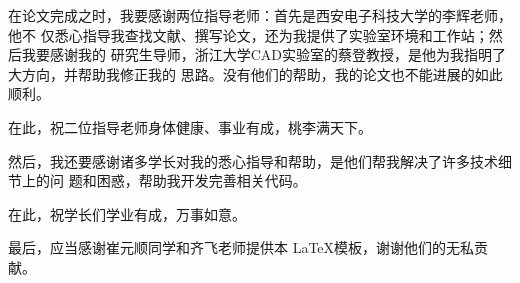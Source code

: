 \begin{thanksfor}
在论文完成之时，我要感谢两位指导老师：首先是西安电子科技大学的李辉老师，他不
仅悉心指导我查找文献、撰写论文，还为我提供了实验室环境和工作站；然后我要感谢我的
研究生导师，浙江大学CAD实验室的蔡登教授，是他为我指明了大方向，并帮助我修正我的
思路。没有他们的帮助，我的论文也不能进展的如此顺利。

在此，祝二位指导老师身体健康、事业有成，桃李满天下。

然后，我还要感谢诸多学长对我的悉心指导和帮助，是他们帮我解决了许多技术细节上的问
题和困惑，帮助我开发完善相关代码。

在此，祝学长们学业有成，万事如意。

最后，应当感谢崔元顺同学和齐飞老师提供本 \LaTeX 模板，谢谢他们的无私贡献。
\end{thanksfor}